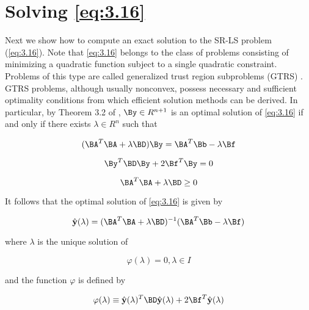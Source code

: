 \startappendix{}
\label{chapter:app1}

\section{Solving \ref{eq:3.16}}

Next we show how to compute an exact solution to the SR-LS problem
(\ref{eq:3.16}). Note that \ref{eq:3.16} belongs to the class of problems
consisting of minimizing a quadratic function subject to a single
quadratic constraint. Problems of this type are called generalized trust
region subproblems (GTRS) \cite{More}. GTRS problems, although usually 
nonconvex, possess necessary and sufficient optimality conditions from
which efficient solution methods can be derived. In particular, by 
Theorem 3.2 of \cite{More}, $\By \in R^{n+1}$ is an optimal solution
of \ref{eq:3.16} if and only if there exists $\lambda \in R^{n}$ 
such that

\begin{equation} \label{eq:A.1}
(\BA^{T}\BA + \lambda\BD)\By = \BA^{T}\Bb - \lambda\Bf
\end{equation}

\begin{equation} \label{eq:A.2}
\By^{T}\BD\By + 2\Bf^{T}\By = 0
\end{equation}

\begin{equation} \label{eq:A.3}
\BA^{T}\BA + \lambda\BD \geq 0
\end{equation}

It follows that the optimal solution of \ref{eq:3.16} is given by

\begin{equation} \label{eq:A.4}
\hat{\mathbf{y}}(\lambda) = (\BA^{T}\BA + \lambda\BD)^{-1}(\BA^{T}\Bb - \lambda\Bf)
\end{equation}

where $\lambda$ is the unique solution of

\begin{equation} 
\label{eq:A.5}
\varphi(\lambda) = 0, \lambda \in I
\end{equation}

and the function $\varphi$ is defined by

\begin{equation} \label{eq:A.6}
\varphi(\lambda) \equiv \hat{\mathbf{y}}(\lambda)^{T}\BD\hat{\mathbf{y}}(\lambda) + 2\Bf^{T}\hat{\mathbf{y}}(\lambda)
\end{equation}


